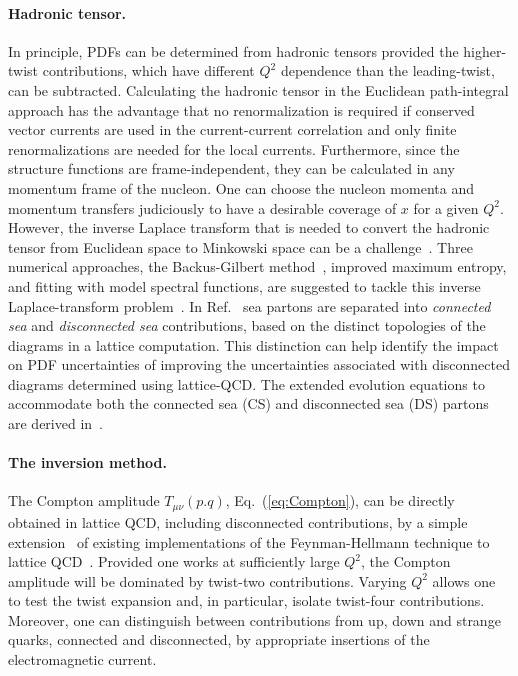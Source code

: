 \paragraph*{Hadronic tensor.} 
In principle, PDFs can be determined from hadronic tensors provided the 
higher-twist contributions, which have different $Q^2$ dependence than the 
leading-twist, can be subtracted. 
%
Calculating the hadronic tensor in the Euclidean path-integral approach
has the advantage that no renormalization is required if conserved vector      
currents are used in the current-current correlation and only finite 
renormalizations are needed for the local currents.
%
Furthermore, since the structure functions are frame-independent, they 
can be calculated in any momentum frame of the nucleon. 
%
One can choose the nucleon momenta and momentum transfers judiciously 
to have a desirable coverage of $x$ for a given $Q^2$. 
%
However, the inverse Laplace transform that is needed to convert the hadronic tensor from Euclidean space to Minkowski space can be a 
challenge~\cite{Liu:1993cv,Liu:1999ak}. 
%
Three numerical approaches, the Backus-Gilbert method~\cite{Hansen:2017mnd}, 
improved maximum entropy, and fitting with model spectral functions, 
are suggested to tackle this inverse Laplace-transform 
problem~\cite{Liu:2016djw}. 
%
In Ref.~\cite{Liu:1993cv} sea partons are separated into {\it connected sea} 
and {\it disconnected sea} contributions, based on the distinct topologies of 
the diagrams in a lattice computation. 
%
This distinction can help identify the impact on PDF uncertainties of 
improving the uncertainties associated with disconnected diagrams determined 
using lattice-QCD.
%
The extended evolution equations to accommodate both the connected sea 
(CS) and disconnected sea (DS) partons are derived in~\cite{Liu:2017lpe}.

\paragraph*{The inversion method.} 
\label{Sec:InversionMethod}

The Compton amplitude $T_{\mu\nu}(p.q)$, Eq.~(\ref{eq:Compton}), can be
directly obtained in lattice QCD, including disconnected contributions,  
by a simple extension~\cite{Chambers:2017dov} of existing implementations of 
the Feynman-Hellmann technique to lattice QCD~\cite{Horsley:2012pz,
Chambers:2014qaa,Chambers:2015bka}.
%
Provided one works at sufficiently large $Q^2$, the Compton amplitude will be 
dominated by twist-two contributions.
%
Varying $Q^2$ allows one to test the twist expansion and, in particular, 
isolate twist-four contributions. Moreover, one can distinguish between 
contributions from up, down and strange quarks, connected and disconnected, 
by appropriate insertions of the electromagnetic current.

